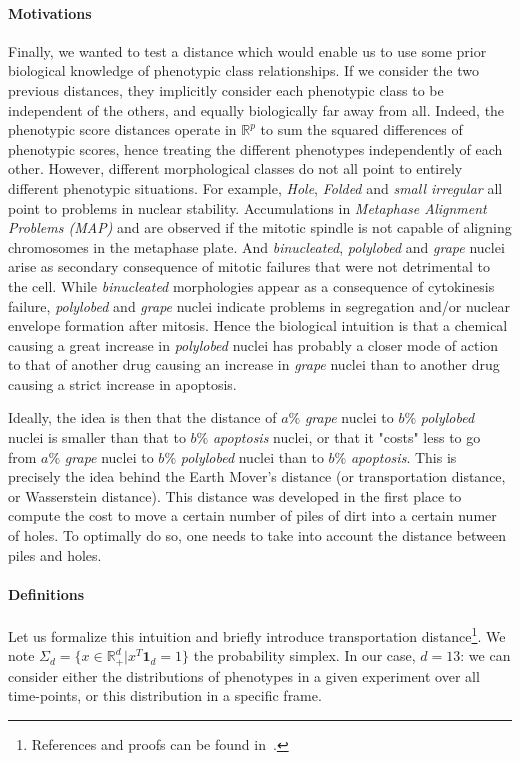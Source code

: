 \paragraph{Motivations}
Finally, we wanted to test a distance which would enable us to use
some prior biological knowledge of phenotypic class relationships. If
we consider the two previous distances, they implicitly consider each
phenotypic class to be independent of the others, and equally
biologically far away from all. Indeed, the phenotypic score distances
operate in $\mathbb{R}^p$ to sum the squared differences of phenotypic
scores, hence treating the different phenotypes independently of
each other. However, different morphological classes do not all point
to entirely different phenotypic situations. For example,
\textit{Hole}, \textit{Folded} and \textit{small irregular} all point
to problems in nuclear stability. Accumulations in \textit{Metaphase Alignment Problems
  (MAP)} and  are observed if the mitotic spindle
is not capable of aligning chromosomes in the metaphase plate. 
And \textit{binucleated}, \textit{polylobed} and
\textit{grape} nuclei arise as secondary consequence of mitotic
failures that were not detrimental to the cell. While
\textit{binucleated} morphologies appear as a consequence of
cytokinesis failure, \textit{polylobed} and \textit{grape} nuclei
indicate problems in segregation and/or nuclear envelope formation
after mitosis. Hence the biological intuition is that a chemical
causing a great increase in \textit{polylobed} nuclei has probably a
closer mode of action to that of another drug causing an increase in
\textit{grape} nuclei than to another drug causing
a strict increase in apoptosis. 

Ideally, the idea is then that the distance of $a\%$ \textit{grape}
nuclei to $b\%$ \textit{polylobed} nuclei is smaller than that to
$b\%$ \textit{apoptosis} nuclei, or that it "costs" less to go from
$a\%$ \textit{grape} nuclei to $b\%$ \textit{polylobed} nuclei
than to $b\%$ \textit{apoptosis}. This is precisely the idea behind
the Earth Mover's distance (or transportation distance, or Wasserstein
distance). This distance was developed in the first place to compute
the cost to move a certain number of piles of dirt into a certain
numer of holes. To optimally do so, one needs to take into account the
distance between piles and holes. 
\paragraph{Definitions}
Let us formalize this intuition and briefly introduce transportation distance\footnote{References and proofs can be found in~\cite{sinkhorn}.}. We note $\Sigma_d = \{ x \in \mathbb{R}^d_+ | x^T \mathbf{1}_d = 1\}$ the probability simplex. In our case, $d=13$: we can consider either the distributions of phenotypes in a given experiment over all time-points, or this distribution in a specific frame.

